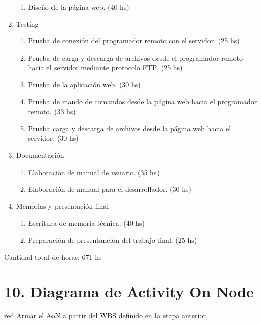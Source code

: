 \documentclass[
11pt, %
]{charter}
\begin{document}
\begin{enumerate}
\begin{enumerate}
	\item Diseño de la página web. (40 hs)
	\end{enumerate}
\item Testing
	\begin{enumerate}
	\item Prueba de conexión del programador remoto con el servidor. (25 hs)
	\item Prueba de carga y descarga de archivos desde el programador remoto hacia el servidor mediante protocolo FTP. (25 hs)
	\item Prueba de la aplicación web. (30 hs)
	\item Prueba de mando de comandos desde la página web hacia el programador remoto. (33 hs)
	\item Prueba carga y descarga de archivos desde la página web hacia el servidor. (30 hs)
	\end{enumerate}
\item Documentación
	\begin{enumerate}
	\item Elaboración de manual de usuario. (35 hs)
	\item Elaboración de manual para el desarrollador. (30 hs)
	\end{enumerate}
\item Memorias y presentación final
	\begin{enumerate}
	\item Escritura de memoria técnica. (40 hs)
	\item Preparación de presentanción del trabajo final. (25 hs)
	\end{enumerate}
\end{enumerate}

Cantidad total de horas: 671 hs

\section{10. Diagrama de Activity On Node}
\label{sec:AoN}

\begin{consigna}{red}
Armar el AoN a partir del WBS definido en la etapa anterior. 



\end{consigna}
\end{document}
